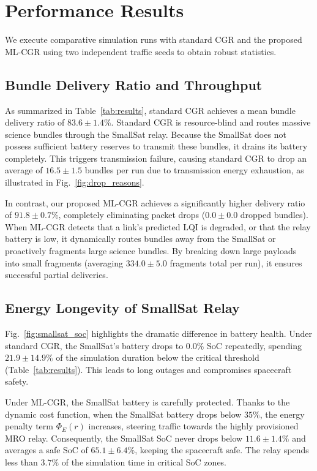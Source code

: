 \documentclass[a4paper,fleqn]{cas-dc}
\newcommand{\mlcgr}{\textsf{ML-CGR}}
\begin{document}
\section{Performance Results}
\label{sec:results}

We execute comparative simulation runs with standard CGR and the proposed \mlcgr{} using two independent traffic seeds to obtain robust statistics.



\subsection{Bundle Delivery Ratio and Throughput}
As summarized in Table~\ref{tab:results}, standard CGR achieves a mean bundle delivery ratio of $83.6 \pm 1.4\%$. Standard CGR is resource-blind and routes massive science bundles through the SmallSat relay. Because the SmallSat does not possess sufficient battery reserves to transmit these bundles, it drains its battery completely. This triggers transmission failure, causing standard CGR to drop an average of $16.5 \pm 1.5$ bundles per run due to transmission energy exhaustion, as illustrated in Fig.~\ref{fig:drop_reasons}.

In contrast, our proposed \mlcgr{} achieves a significantly higher delivery ratio of $91.8 \pm 0.7\%$, completely eliminating packet drops ($0.0 \pm 0.0$ dropped bundles). When \mlcgr{} detects that a link's predicted LQI is degraded, or that the relay battery is low, it dynamically routes bundles away from the SmallSat or proactively fragments large science bundles. By breaking down large payloads into small fragments (averaging $334.0 \pm 5.0$ fragments total per run), it ensures successful partial deliveries. 

\subsection{Energy Longevity of SmallSat Relay}
Fig.~\ref{fig:smallsat_soc} highlights the dramatic difference in battery health. Under standard CGR, the SmallSat's battery drops to $0.0\%$ SoC repeatedly, spending $21.9 \pm 14.9\%$ of the simulation duration below the critical threshold (Table~\ref{tab:results}). This leads to long outages and compromises spacecraft safety.

Under \mlcgr{}, the SmallSat battery is carefully protected. Thanks to the dynamic cost function, when the SmallSat battery drops below $35\%$, the energy penalty term $\Phi_E(r)$ increases, steering traffic towards the highly provisioned MRO relay. Consequently, the SmallSat SoC never drops below $11.6 \pm 1.4\%$ and averages a safe SoC of $65.1 \pm 6.4\%$, keeping the spacecraft safe. The relay spends less than $3.7\%$ of the simulation time in critical SoC zones.
\end{document}
